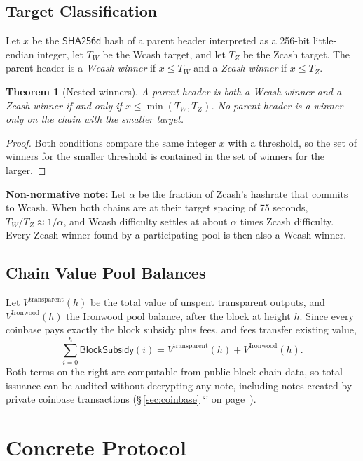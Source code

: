 \documentclass[10pt,letterpaper]{article}
\newcommand\term[1]{\textsl{#1}}
\newcommand\fn[1]{\mathsf{#1}}
\newcommand\secref[1]{\S\,\ref{#1} `\nameref{#1}' on page~\pageref{#1}}
\newcommand\rules[1]{\par\textbf{#1}}
\theoremstyle{plain}
\newtheorem{theorem}{Theorem}[subsection]
\begin{document}
\subsection{Target Classification}\label{sec:classification}

Let $x$ be the $\fn{SHA256d}$ hash of a parent header interpreted as a 256-bit little-endian integer, let $T_W$ be the Wcash target, and let $T_Z$ be the Zcash target. The parent header is a \term{Wcash winner} if $x \le T_W$ and a \term{Zcash winner} if $x \le T_Z$.

\begin{theorem}[Nested winners]\label{thm:nested}
A parent header is both a Wcash winner and a Zcash winner if and only if $x \le \min(T_W, T_Z)$. No parent header is a winner only on the chain with the smaller target.
\end{theorem}

\begin{proof}
Both conditions compare the same integer $x$ with a threshold, so the set of winners for the smaller threshold is contained in the set of winners for the larger.
\end{proof}

\rules{Non-normative note:} Let $\alpha$ be the fraction of Zcash's hashrate that commits to Wcash. When both chains are at their target spacing of 75 seconds, $T_W / T_Z \approx 1/\alpha$, and Wcash difficulty settles at about $\alpha$ times Zcash difficulty. Every Zcash winner found by a participating pool is then also a Wcash winner.

\subsection{Chain Value Pool Balances}\label{sec:balances}

Let $V^{\mathrm{transparent}}(h)$ be the total value of unspent transparent outputs, and $V^{\mathrm{Ironwood}}(h)$ the Ironwood pool balance, after the block at height $h$. Since every coinbase pays exactly the block subsidy plus fees, and fees transfer existing value,
\[
\sum_{i=0}^{h} \fn{BlockSubsidy}(i) = V^{\mathrm{transparent}}(h) + V^{\mathrm{Ironwood}}(h).
\]
Both terms on the right are computable from public block chain data, so total issuance can be audited without decrypting any note, including notes created by private coinbase transactions (\secref{sec:coinbase}).

\section{Concrete Protocol}\label{sec:concrete}
\end{document}
